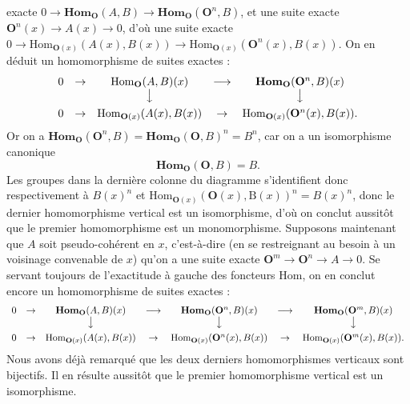\clearpage
{}

\noindent exacte
$0\to\mathbf{Hom}_{\mathbf O}(A,B)\to
\mathbf{Hom}_{\mathbf O}({\mathbf O}^n,B)$, et une suite exacte
${\mathbf O}^n(x)\to A(x)\to0$, d'où une suite exacte
$0\to\mathrm{Hom}_{{\mathbf O}(x)}(A(x),B(x))\to
\mathrm{Hom}_{{\mathbf O}(x)}({\mathbf O}^n(x),B(x))$. On en déduit un homomorphisme de suites
exactes :
\[
\begin{array}{ccccc}
0&\to&\mathrm{Hom}_{\mathbf O}(A,B)(x)&\longrightarrow&
  \mathbf{Hom}_{\mathbf O}({\mathbf O}^n,B)(x)\\
&&\big\downarrow&&\big\downarrow\\[0.45em]
0&\to&\mathrm{Hom}_{{\mathbf O}(x)}(A(x),B(x))&\to&
  \mathrm{Hom}_{{\mathbf O}(x)}({\mathbf O}^n(x),B(x)).
\end{array}
\]
Or on a $\mathbf{Hom}_{\mathbf O}({\mathbf O}^n,B)=\mathbf{Hom}_{\mathbf O}({\mathbf O},B)^n=B^n$, car on a un
isomorphisme canonique
\[
\tag{4.3.4}
\mathbf{Hom}_{\mathbf O}({\mathbf O},B)=B.
\]
Les groupes dans la dernière colonne du diagramme s'identifient donc
respectivement à $B(x)^n$ et
$\mathrm{Hom}_{{\mathbf O}(x)}({\mathbf O}(x),\mathrm B(x))^n=B(x)^n$, donc le dernier homomorphisme
vertical est un isomorphisme, d'où on conclut aussitôt que le premier
homomorphisme est un monomorphisme. Supposons maintenant que $A$ soit
pseudo-cohérent en $x$, c'est-à-dire (en se restreignant au besoin à un
voisinage convenable de $x$) qu'on a une suite exacte
${\mathbf O}^m\to {\mathbf O}^n\to A\to0$. Se servant
toujours de l'exactitude à gauche des foncteurs $\mathrm{Hom}$, on en conclut
encore un homomorphisme de suites exactes :
\[
\begin{array}{ccccccc}
0&\to&\mathbf{Hom}_{\mathbf O}(A,B)(x)&\longrightarrow&
  \mathbf{Hom}_{\mathbf O}({\mathbf O}^n,B)(x)&\longrightarrow&\mathbf{Hom}_{\mathbf O}({\mathbf O}^m,B)(x)\\
&&\big\downarrow&&\big\downarrow&&\big\downarrow\\[0.45em]
0&\to&\mathrm{Hom}_{{\mathbf O}(x)}(A(x),B(x))&\to&
  \mathrm{Hom}_{{\mathbf O}(x)}({\mathbf O}^n(x),B(x))&\to&
  \mathrm{Hom}_{{\mathbf O}(x)}({\mathbf O}^m(x),B(x)).
\end{array}
\]
Nous avons déjà remarqué que les deux derniers homomorphismes verticaux sont
bijectifs. Il en résulte aussitôt que le premier homomorphisme vertical est un
isomorphisme.

